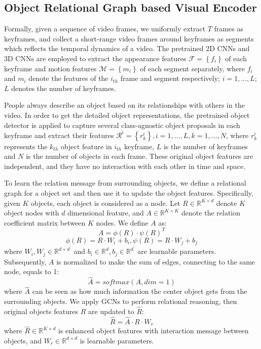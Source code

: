 \documentclass[10pt,twocolumn,letterpaper]{article}
\begin{document}
\subsection{Object Relational Graph based Visual Encoder}

Formally, given a sequence of video frames, we uniformly extract $ T $ frames as keyframes, and collect a short-range video frames around keyframes as segments which reflects the temporal dynamics of a video.
The pretrained 2D CNNs and 3D CNNs are employed to extract the appearance features $ \mathcal{F}=\left\lbrace f_i \right\rbrace $ of each keyframe and motion features $ \mathcal{M} = \left\lbrace m_i \right\rbrace $ of each segment separately, where $f_i $ and $ m_i $ denote the features of the $ i_{th} $ frame and segment respectively; $i = 1,\dots,L $; $ L $ denotes the number of keyframes.

People always describe an object based on its relationships with others in the video. In order to get the detailed object representations, the pretrained object detector is applied to capture several class-agnostic object proposals in each keyframe and extract their features $ \mathcal{R}^{i} = \left\lbrace r_k^i \right\rbrace, i = 1,\dots,L, k = 1,\dots,N $, where $ r_k^i $ represents the $ k_{th} $ object feature in $ i_{th}$ keyframe, $L$ is the number of keyframes and $ N $ is the number of objects in each frame. These original object features are independent, and they have no interaction with each other in time and space.

To learn the relation message from surrounding objects, we define a relational graph for a object set and then use it to update the object features. Specifically, given $K$ objects, each object is considered as a node. Let $R \in \mathbb{R}^{K\times d}$ denote $K$ object nodes with $d$ dimensional feature, and $A \in \mathbb{R}^{K \times K}$ denote the relation coefficient matrix between $K$ nodes. We define $A$ as: 
\begin{equation}\label{key}
A = \phi(R)\cdot\psi(R)^T
\end{equation}
\begin{equation}\label{key}
\phi(R) = R\cdot W_i+b_i, \psi(R) = R\cdot W_j+b_j
\end{equation}
where $W_i,W_j \in \mathbb{R}^{d\times d^{'}}$ and $b_i \in \mathbb{R}^d,b_j \in \mathbb{R}^{d^{'}}$ are learnable parameters. Subsequently, $A$ is normalized to make the sum of edges, connecting to the same node, equals to 1:
\begin{equation}\label{key}
\hat{A} = softmax(A, dim=1)
\end{equation}
where $\hat{A}$ can be seen as how much information the center object gets from the surrounding objects. We apply GCNs to perform relational reasoning, then original objects features $R$ are updated to $\hat{R}$:
\begin{equation}\label{key}
\hat{R} = \hat{A}\cdot R\cdot W_r
\end{equation}
where $\hat{R} \in \mathbb{R}^{K\times d}$ is enhanced object features with interaction message between objects, and $W_r \in \mathbb{R}^{d\times d}$ is learnable parameters.
\end{document}
